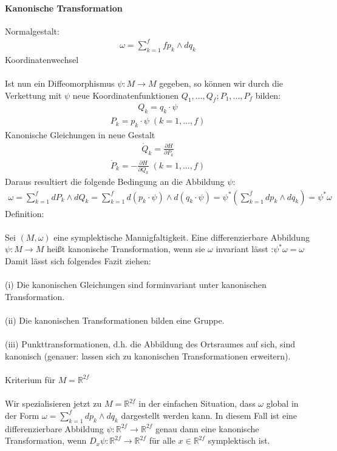 \documentclass[10pt,a4paper]{article}
\begin{document}
\paragraph{Kanonische Transformation} $\,$ \\
Normalgestalt:
\begin{align}
\omega= \sum_{k=1}^f fp_k \wedge dq_k
\end{align}
Koordinatenwechsel\\
\\
Ist nun ein Diffeomorphismus $ \psi : M \longrightarrow M $ gegeben, so können wir durch die Verkettung mit $ \psi $ neue Koordinatenfunktionen $Q_1,...,Q_f;P_1,...,P_f$ bilden:
\begin{align}
Q_k=q_k \cdot \psi
\end{align} 
\begin{align}
P_k = p_k \cdot \psi \; (k=1,...,f)
\end{align}
Kanonische Gleichungen in neue Gestalt
\begin{align}
\dot{Q}_k =\frac{\partial H}{\partial P_k}
\end{align}
\begin{align}
\dot{P}_k= -\frac{\partial H}{\partial Q_k} \; (k=1,...,f)
\end{align}
Daraus resultiert die folgende Bedingung an die Abbildung $\psi$:
\begin{align}
\omega= \sum_{k=1}^f dP_k \wedge dQ_k= \sum_{k=1}^f d(p_k \cdot \psi) \wedge d(q_k \cdot \psi)= \psi^* (\sum_{k=1}^f dp_k \wedge dq_k)= \psi^* \omega
\end{align}
Definition:\\
\\
Sei $(M,\omega)$ eine symplektische Mannigfaltigkeit. Eine differenzierbare Abbildung $ \psi : M \longrightarrow M $ heißt kanonische Transformation, wenn sie $ \omega $ invariant lässt :$ \psi^* \omega=\omega$
Damit lässt sich folgendes Fazit ziehen: \\
\\
(i) Die kanonischen Gleichungen sind forminvariant unter kanonischen Transformation.\\
\\
(ii) Die kanonischen Transformationen bilden eine Gruppe.\\
\\
(iii) Punkttransformationen, d.h. die Abbildung des Ortsraumes auf sich, sind kanonisch (genauer: lassen sich zu kanonischen Transformationen erweitern).\\
\\
Kriterium für $ M= \mathbb{R}^{2f}$\\
\\
Wir spezialisieren jetzt zu $ M= \mathbb{R}^{2f}$ in der einfachen Situation, dass $\omega$ global in der Form $ \omega=\sum_{k=1}^f dp_k \wedge dq_k $ dargestellt werden kann. In diesem Fall ist eine differenzierbare Abbildung $ \psi: \mathbb{R}^{2f} \longrightarrow \mathbb{R}^{2f} $ genau dann eine kanonische Transformation, wenn $ D_x \psi : \mathbb{R}^{2f} \longrightarrow \mathbb{R}^{2f} $ für alle $ x \in \mathbb{R}^{2f}$ symplektisch ist.
\end{document}

